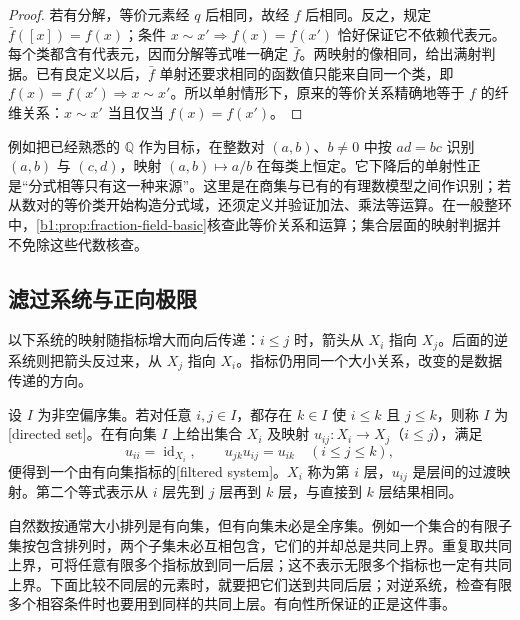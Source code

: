 \begin{proof}
	若有分解，等价元素经 \(q\) 后相同，故经 \(f\) 后相同。反之，规定 \(\bar f([x])=f(x)\)；条件 \(x\sim x'\Rightarrow f(x)=f(x')\) 恰好保证它不依赖代表元。每个类都含有代表元，因而分解等式唯一确定 \(\bar f\)。两映射的像相同，给出满射判据。已有良定义以后，\(\bar f\) 单射还要求相同的函数值只能来自同一个类，即 \(f(x)=f(x')\Rightarrow x\sim x'\)。所以单射情形下，原来的等价关系精确地等于 \(f\) 的纤维关系：\(x\sim x'\) 当且仅当 \(f(x)=f(x')\)。
\end{proof}

例如把已经熟悉的 \(\mathbb Q\) 作为目标，在整数对 \((a,b)\)、\(b\ne0\) 中按 \(ad=bc\) 识别 \((a,b)\) 与 \((c,d)\)，映射 \((a,b)\mapsto a/b\) 在每类上恒定。它下降后的单射性正是“分式相等只有这一种来源”。这里是在商集与已有的有理数模型之间作识别；若从数对的等价类开始构造分式域，还须定义并验证加法、乘法等运算。在一般整环中，\cref{b1:prop:fraction-field-basic}核查此等价关系和运算；集合层面的映射判据并不免除这些代数核查。

\subsection{滤过系统与正向极限}
\label{b1:subsec:A02:02}

以下系统的映射随指标增大而向后传递：\(i\leq j\) 时，箭头从 \(X_i\) 指向 \(X_j\)。后面的逆系统则把箭头反过来，从 \(X_j\) 指向 \(X_i\)。指标仍用同一个大小关系，改变的是数据传递的方向。

\begin{definition}\label{b1:def:directed-system}
	设 \(I\) 为非空偏序集。若对任意 \(i,j\in I\)，都存在 \(k\in I\) 使 \(i\leq k\) 且 \(j\leq k\)，则称 \(I\) 为[directed set]。在有向集 \(I\) 上给出集合 \(X_i\) 及映射 \(u_{ij}:X_i\rightarrow X_j\)（\(i\leq j\)），满足
	\[
		u_{ii}=\operatorname{id}_{X_i},\qquad u_{jk}u_{ij}=u_{ik}\quad(i\leq j\leq k),
	\]
	便得到一个由有向集指标的[filtered system]。\(X_i\) 称为第 \(i\) 层，\(u_{ij}\) 是层间的过渡映射。第二个等式表示从 \(i\) 层先到 \(j\) 层再到 \(k\) 层，与直接到 \(k\) 层结果相同。
\end{definition}

自然数按通常大小排列是有向集，但有向集未必是全序集。例如一个集合的有限子集按包含排列时，两个子集未必互相包含，它们的并却总是共同上界。重复取共同上界，可将任意有限多个指标放到同一后层；这不表示无限多个指标也一定有共同上界。下面比较不同层的元素时，就要把它们送到共同后层；对逆系统，检查有限多个相容条件时也要用到同样的共同上层。有向性所保证的正是这件事。

